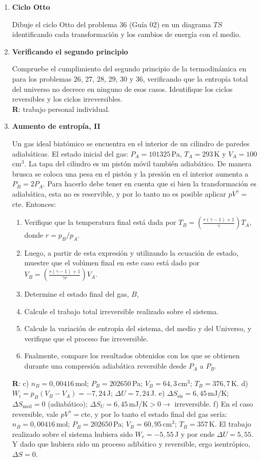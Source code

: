 \documentclass[a4paper,12pt]{article}
\begin{document}
\begin{enumerate}
	\item {\bf{Ciclo Otto}}

		Dibuje el ciclo Otto del problema 36 (Guía 02) en un diagrama $TS$
		identificando cada transformación y los cambios de energía con el
		medio.

	\item {\bf{Verificando el segundo principio}}

		Compruebe el cumplimiento del segundo principio de la termodinámica en
		para los problemas 26, 27, 28, 29, 30 y 36, verificando que la entropía total
		del universo no decrece en ninguno de esos casos. Identifique los
		ciclos reversibles y los ciclos irreversibles.
        \\{\bf{R}}: trabajo personal individual.
		
	
	\item {\bf{Aumento de entropía, II}}
		
		Un gas ideal biatómico se encuentra en el interior de un cilindro de
		paredes adiabáticas. El estado inicial del gas: $P_A=101325$\,Pa,
		$T_A=293$\,K y $V_A=100$\,cm$^3$. La tapa del cilindro es un pistón
		móvil también adiabático. De manera brusca se coloca una pesa en el
		pistón y la presión en el interior aumenta a $P_B=2 P_A$. Para hacerlo
		debe tener en cuenta que si bien la transformación es adiabática, esta
		no es reservible, y por lo tanto no es posible aplicar
		$pV^{\gamma}=$cte. Entonces:
		\begin{enumerate}
			\item Verifique que la temperatura final está dada por $T_B=\left (
				\frac{r (\gamma-1) + 1}{\gamma}\right ) T_A$, donde $r=p_B/p_A$.
			\item Luego, a partir de esta expresión y utilizando la ecuación de
				estado, muestre que el volúmen final en este caso está dado por
				$V_B=\left ( \frac{r (\gamma-1) + 1}{\gamma r}\right ) V_A$.
			\item Determine el estado final del gas, $B$, 
			\item Calcule el trabajo total irreversible realizado sobre el
				sistema. 
			\item Calcule la variación de entropía del sistema, del medio y del
				Universo, y verifique que el proceso fue irreversible.
			\item Fnalmente, compare los resultados obtenidos con los que se
				obtienen durante una compresión adiabática reversible desde
				$P_A$ a $P_B$.
		\end{enumerate}
		{\bf{R}}: 
		c) $n_B=0,00416$\,mol; $P_B=202650$\,Pa; $V_B=64,3$\,cm$^3$; $T_B=376,7$\,K. 
		d) $W_i = p_B (V_B - V_A) = -7,24$\,J; $\Delta U = 7,24$\,J.
		e) $\Delta S_{\mathrm{sis}}=6,45$\,mJ/K; $\Delta S_{\mathrm{med}}=0$
		(adiabático); $\Delta S_U=6,45$\,mJ/K$>0\to$ irreversible.
		f) En el caso reversible, vale $pV^\gamma=$cte, y por lo tanto el
		estado final del gas sería: $n_B=0,00416$\,mol; $P_B=202650$\,Pa;
		$V_B=60,95$\,cm$^3$; $T_B=357$\,K. El trabajo realizado sobre el
		sistema hubiera sido $W_r=-5,55$\,J y por ende $\Delta U=5,55$. Y dado
		que hubiera sido un proceso adibático y reversible, ergo isentrópico,
		$\Delta S=0$.
\end{enumerate}
\end{document}
